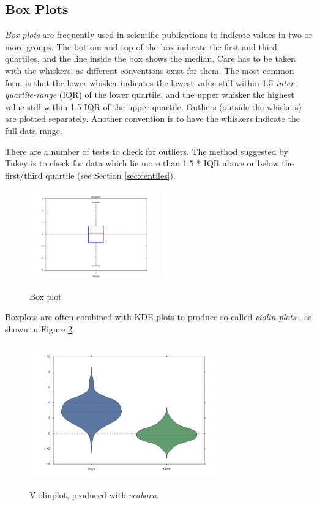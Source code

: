 \subsection{Box Plots}

\emph{Box plots} are frequently used in scientific publications to indicate values in two or more groups. The bottom and top of the box indicate the first and third quartiles, and the line inside the box shows the median. Care has to be taken with the whiskers, as different conventions exist for them. The most common form is that the lower whisker indicates the lowest value still within 1.5 \emph{inter-quartile-range} (IQR) of the lower quartile, and the upper whisker the highest value still within 1.5 IQR of the upper quartile. Outliers (outside the whiskers) are plotted separately. Another convention is to have the whiskers indicate the full data range.

There are a number of tests to check for outliers. The method suggested by Tukey is to check for data which lie more than 1.5 * IQR above or below the first/third quartile (see Section \ref{sec:centiles}).

\begin{figure}[!ht]
  \centering
  \includegraphics[width=0.5\textwidth]{../Images/boxplot.png}\\
  \caption{Box plot}\label{fig:Boxplot}
\end{figure}

Boxplots are often combined with KDE-plots to produce so-called \emph{violin-plots} , as shown in Figure \ref{fig:violin}.

\begin{figure}
  \centering
  \includegraphics[width=0.75\textwidth]{../Images/violinplot.png}\\
  \caption{Violinplot, produced with \emph{seaborn}.}\label{fig:violin}
\end{figure}

